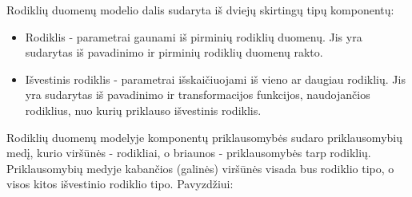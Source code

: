 \documentclass{VUMIFPSbakalaurinis}
\begin{document}
Rodiklių duomenų modelio dalis sudaryta iš dviejų skirtingų tipų komponentų:
\begin{itemize}
    \item Rodiklis - parametrai gaunami iš pirminių rodiklių duomenų. Jis yra sudarytas iš pavadinimo ir pirminių rodiklių duomenų rakto.
    \item Išvestinis rodiklis - parametrai išskaičiuojami iš vieno ar daugiau rodiklių. Jis yra sudarytas iš pavadinimo ir transformacijos funkcijos, naudojančios rodiklius, nuo kurių priklauso išvestinis rodiklis. 
\end{itemize}
Rodiklių duomenų modelyje komponentų priklausomybės sudaro priklausomybių medį, kurio viršūnės - rodikliai, o briaunos - priklausomybės tarp rodiklių. Priklausomybių medyje kabančios (galinės) viršūnės visada bus rodiklio tipo, o visos kitos išvestinio rodiklio tipo.
Pavyzdžiui:
\end{document}

